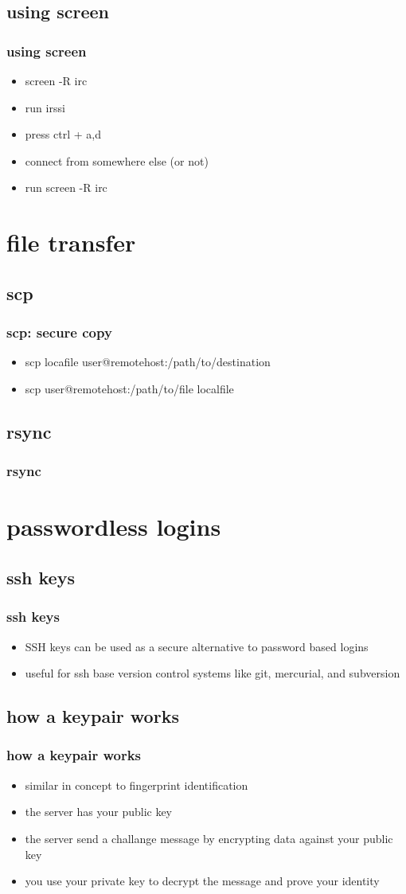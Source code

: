 \documentclass[hyperref={pdfpagelabels=false}]{beamer}
\begin{document}
\subsection{using screen}
\frame
{
  \frametitle{using screen}
  \begin{itemize}
  \item{screen -R irc}
  \item{run irssi}
  \item{press ctrl + a,d}
  \item{connect from somewhere else (or not)}
  \item{run screen -R irc}
  \end{itemize}
}
\section{file transfer}
\subsection{scp}
\frame
{
    \frametitle{scp: secure copy}
    \begin{itemize}
    \item{scp locafile user@remotehost:/path/to/destination}
    \item{scp user@remotehost:/path/to/file localfile}
    \end{itemize}
}
\subsection{rsync}
\frame
{
    \frametitle{rsync}
}
\section{passwordless logins}
\subsection{ssh keys}
\frame
{
    \frametitle{ssh keys}
    \begin{itemize}
    \item{SSH keys can be used as a secure alternative to password based logins}
    \item{useful for ssh base version control systems like git, mercurial, and subversion}
    \end{itemize}
}
\subsection{how a keypair works}
\frame
{
    \frametitle{how a keypair works}
    \begin{itemize}
    \item{similar in concept to fingerprint identification}
    \item{the server has your public key}
    \item{the server send a challange message by encrypting data against your public key}
    \item{you use your private key to decrypt the message and prove your identity}
    \end{itemize}
}
\end{document}
